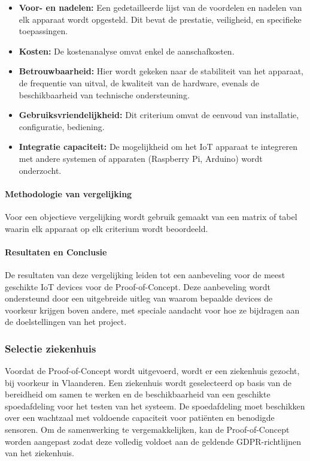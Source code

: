 \begin{itemize}
    \item \textbf{Voor- en nadelen:} Een gedetailleerde lijst van de voordelen en nadelen van elk apparaat wordt opgesteld. Dit bevat de prestatie, veiligheid, en specifieke toepassingen.
    
    \item \textbf{Kosten:} De kostenanalyse omvat enkel de aanschafkosten.
    
    \item \textbf{Betrouwbaarheid:} Hier wordt gekeken naar de stabiliteit van het apparaat, de frequentie van uitval, de kwaliteit van de hardware, evenals de beschikbaarheid van technische ondersteuning.
    
    \item \textbf{Gebruiksvriendelijkheid:} Dit criterium omvat de eenvoud van installatie, configuratie, bediening.

    \item \textbf{Integratie capaciteit:} De mogelijkheid om het IoT apparaat te integreren met andere systemen of apparaten (Raspberry Pi, Arduino) wordt onderzocht. 
\end{itemize}

\paragraph*{Methodologie van vergelijking}
Voor een objectieve vergelijking wordt gebruik gemaakt van een matrix of tabel waarin elk apparaat op elk criterium wordt beoordeeld.

\paragraph*{Resultaten en Conclusie}
De resultaten van deze vergelijking leiden tot een aanbeveling voor de meest geschikte IoT devices voor de Proof-of-Concept. Deze aanbeveling wordt ondersteund door een uitgebreide uitleg van waarom bepaalde devices de voorkeur krijgen boven andere, met speciale aandacht voor hoe ze bijdragen aan de doelstellingen van het project.

\subsubsection*{Selectie ziekenhuis}
Voordat de Proof-of-Concept wordt uitgevoerd, wordt er een ziekenhuis gezocht, bij voorkeur in Vlaanderen. Een ziekenhuis wordt geselecteerd op basis van de bereidheid om samen te werken en de beschikbaarheid van een geschikte spoedafdeling voor het testen van het systeem. De spoedafdeling moet beschikken over een wachtzaal met voldoende capaciteit voor patiënten en benodigde sensoren. Om de samenwerking te vergemakkelijken, kan de Proof-of-Concept worden aangepast zodat deze volledig voldoet aan de geldende GDPR-richtlijnen van het ziekenhuis.

